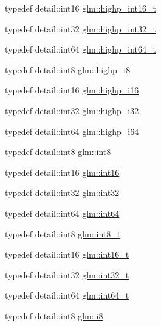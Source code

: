 \begin{DoxyCompactItemize}
\item 
typedef detail\+::int16 \hyperlink{group__gtc__type__precision_ga07d318d61472e75238e53b9642227672}{glm\+::highp\+\_\+int16\+\_\+t}
\item 
typedef detail\+::int32 \hyperlink{group__gtc__type__precision_ga783d077a513c1f475f6cdb406b4238c3}{glm\+::highp\+\_\+int32\+\_\+t}
\item 
typedef detail\+::int64 \hyperlink{group__gtc__type__precision_ga0f5186bde44471133b08057cae8a51ac}{glm\+::highp\+\_\+int64\+\_\+t}
\item 
typedef detail\+::int8 \hyperlink{group__gtc__type__precision_ga8b9eb0b24cce7f14478bfcacb53ce839}{glm\+::highp\+\_\+i8}
\item 
typedef detail\+::int16 \hyperlink{group__gtc__type__precision_gaa04399853952dbce29cb62e2432f350a}{glm\+::highp\+\_\+i16}
\item 
typedef detail\+::int32 \hyperlink{group__gtc__type__precision_ga197d19b585222da57d70238a5cfc2be8}{glm\+::highp\+\_\+i32}
\item 
typedef detail\+::int64 \hyperlink{group__gtc__type__precision_gad3cb9a0ac0266ea2c51c6fac256345d1}{glm\+::highp\+\_\+i64}
\item 
typedef detail\+::int8 \hyperlink{group__gtc__type__precision_ga96254f9c1c4506fc8eb5cf3301ce8565}{glm\+::int8}
\item 
typedef detail\+::int16 \hyperlink{group__gtc__type__precision_ga2945a61d12771f8954994fcddf02b021}{glm\+::int16}
\item 
typedef detail\+::int32 \hyperlink{group__gtc__type__precision_ga632d8b25f6b61659f39ea4321fab92a4}{glm\+::int32}
\item 
typedef detail\+::int64 \hyperlink{group__gtc__type__precision_ga435d75819cce297cc5fa21bd84ef89a5}{glm\+::int64}
\item 
typedef detail\+::int8 \hyperlink{group__gtc__type__precision_ga673898d450b2a91186f3c4f40c5f8633}{glm\+::int8\+\_\+t}
\item 
typedef detail\+::int16 \hyperlink{group__gtc__type__precision_gaf89ee61e0d34aa4a462104b7ae7f2da6}{glm\+::int16\+\_\+t}
\item 
typedef detail\+::int32 \hyperlink{group__gtc__type__precision_gab870c0eb6f525b0c8c4716762e0fc3a8}{glm\+::int32\+\_\+t}
\item 
typedef detail\+::int64 \hyperlink{group__gtc__type__precision_ga6abb23fbf4e39c50ec5341160b5da5ab}{glm\+::int64\+\_\+t}
\item 
typedef detail\+::int8 \hyperlink{group__gtc__type__precision_gaae064be68b7d36cd7910c16e8ad18bba}{glm\+::i8}

\end{DoxyCompactItemize}
